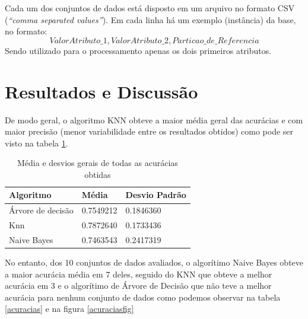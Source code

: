 \documentclass[12pt, a4paper]{article}
\begin{document}
Cada um dos conjuntos de dados está disposto em um arquivo no formato CSV (\emph{``comma separated values''}). Em cada linha há um exemplo (instância) da base, no formato: $$Valor Atributo\_1, Valor Atributo\_2, Particao\_de\_Referencia$$ Sendo utilizado para o processamento apenas os dois primeiros atributos.

\section{Resultados e Discussão}

De modo geral, o algoritmo KNN obteve a maior média geral das acurácias e com maior precisão (menor variabilidade entre os resultados obtidos) como pode ser visto na tabela \ref{acuracias_geral}.


\begin{table}[!ht]
\centering
\caption{Média e desvios gerais de todas as acurácias obtidas}
\label{acuracias_geral}
\begin{tabular}{|l|l|l|}
\hline
Algoritmo & Média & Desvio Padrão\\
\hline
Árvore de decisão & 0.7549212 &0.1846360\\
Knn & 0.7872640 &0.1733436 \\
Naive Bayes &
0.7463543 &0.2417319\\
\hline
\end{tabular}
\end{table}

No entanto, dos 10 conjuntos de dados avaliados, o algorítimo Naive Bayes obteve a maior acurácia média em 7 deles, seguido do KNN que obteve a melhor acurácia em 3 e o algorítimo de Árvore de Decisão que não teve a melhor acurácia para nenhum conjunto de dados como podemos observar na tabela \ref{acuracias} e na figura \ref{acuraciasfig}
\end{document}
